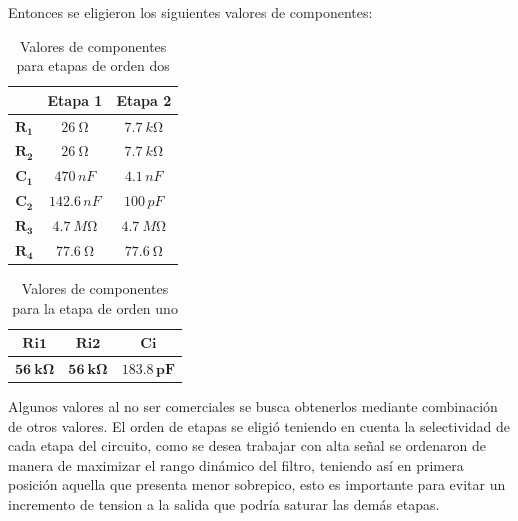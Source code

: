	Entonces se eligieron los siguientes valores de componentes:
	
\begin{table}[H]
\centering
\begin{tabular}{|c|c|c|}
\hline
            & \textbf{Etapa 1} & \textbf{Etapa 2} \\ \hline
$\mathbf{R_1}$ & $\SI{26}{\ohm}$               & $\SI{7.7}{k\ohm}$             \\ \hline
$\mathbf{R_2}$ & $\SI{26}{\ohm}$               & $\SI{7.7}{k\ohm}$             \\ \hline
$\mathbf{C_1}$ & $470 \, nF$             & $4.1 \, nF$              \\ \hline
$\mathbf{C_2}$ & $142.6 \, nF$           & $100 \, pF$             \\ \hline
$\mathbf{R_3}$ & $\SI{4.7}{M\ohm}$             & $\SI{4.7}{M\ohm}$             \\ \hline
$\mathbf{R_4}$ & $\SI{77.6}{\ohm}$             & $\SI{77.6}{\ohm}$             \\ \hline
\end{tabular}
\caption{Valores de componentes para etapas de orden dos}
\label{tabla:legendreetapasorden2}
\end{table}

\begin{table}[H]
\centering
\begin{tabular}{|c|c|c|}
\hline
$\mathbf{Ri1}$ & $\mathbf{Ri2}$ & $\mathbf{Ci}$     \\ \hline
$\mathbf{\SI{56}{k\ohm}}$ & $\mathbf{\SI{56}{k\ohm}}$ & $\mathbf{183.8 \,pF}$ \\ \hline
\end{tabular}
\caption{Valores de componentes para la etapa de orden uno}
\label{tabla:legendreetapaorden1}
\end{table}
	Algunos valores al no ser comerciales se busca obtenerlos mediante combinación de otros valores.
	El orden de etapas se eligió teniendo en cuenta la selectividad de cada etapa del circuito, como se desea trabajar con alta señal se ordenaron de manera de maximizar el rango dinámico del filtro, teniendo así en primera posición aquella que presenta menor sobrepico, esto es importante para evitar un incremento de tension a la salida que podría saturar las demás etapas.
	
